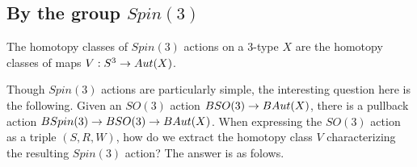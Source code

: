 \documentclass{amsart}
\begin{document}
\subsection{By the group $Spin(3)$}

\begin{prop}
The homotopy classes of $Spin(3)$ actions on a 3-type $X$ are the homotopy classes of maps $V: S^3 \rightarrow Aut(X)$.
\end{prop}

Though $Spin(3)$ actions are particularly simple, the interesting question here is the following. Given an $SO(3)$ action $BSO(3) \rightarrow BAut(X)$, there is a pullback action $BSpin(3) \rightarrow BSO(3) \rightarrow BAut(X)$. When expressing the $SO(3)$ action as a triple $(S,R,W)$, how do we extract the homotopy class $V$ characterizing the resulting $Spin(3)$ action? The answer is as folows. 
\end{document}
